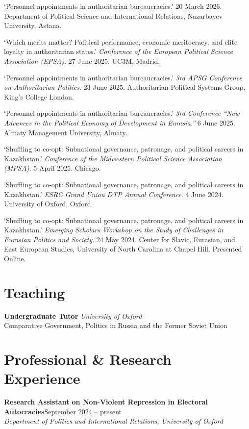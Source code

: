 \documentclass[10pt, a4paper]{article}
\begin{document}

`Personnel appointments in authoritarian bureaucracies.' 20 March 2026. Department of Political Science and International Relations, Nazarbayev University, Astana.

`Which merits matter? Political performance, economic meritocracy, and elite loyalty in authoritarian states.' \textit{Conference of the European Political Science Association (EPSA)}. 27 June 2025. UC3M, Madrid.

`Personnel appointments in authoritarian bureaucracies.' \textit{3rd APSG Conference on Authoritarian Politics}. 23 June 2025. Authoritarian Political Systems Group, King's College London.

`Personnel appointments in authoritarian bureaucracies.' \textit{3rd Conference ``New Advances in the Political Economy of Development in Eurasia.''} 6 June 2025. Almaty Management University, Almaty.

`Shuffling to co-opt: Subnational governance, patronage, and political careers in Kazakhstan.' \textit{Conference of the Midwestern Political Science Association (MPSA)}. 5 April 2025. Chicago.

`Shuffling to co-opt: Subnational governance, patronage, and political careers in Kazakhstan.' \textit{ESRC Grand Union DTP Annual Conference}. 4 June 2024. University of Oxford, Oxford.

`Shuffling to co-opt: Subnational governance, patronage, and political careers in Kazakhstan.' \textit{Emerging Scholars Workshop on the Study of Challenges in Eurasian Politics and Society}. 24 May 2024. Center for Slavic, Eurasian, and East European Studies, University of North Carolina at Chapel Hill. Presented Online.

\section{Teaching}

\textbf{Undergraduate Tutor} \textit{University of Oxford}\\
Comparative Government, Politics in Russia and the Former Soviet Union

\section{Professional \& Research Experience}

\begin{samepage}
  \textbf{Research Assistant on Non-Violent Repression in Electoral Autocracies}\hfill{}\linebreak September 2024 -- present\\
  \textit{Department of Politics and International Relations, University of Oxford}
\end{samepage}
\end{document}
